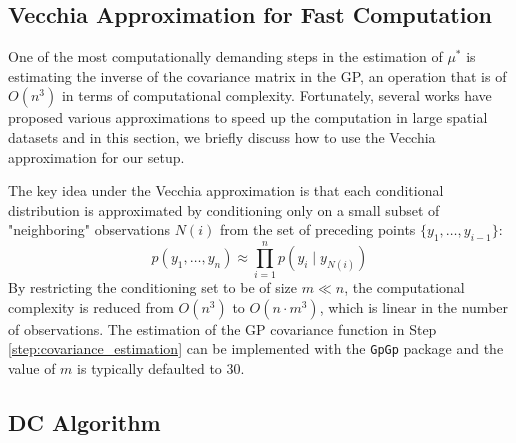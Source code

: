 \documentclass[12pt]{article}
\begin{document}
\subsection{Vecchia Approximation for Fast Computation}\label{sec:vecchia}

One of the most computationally demanding steps in the estimation of $\mu^*$ is estimating the inverse of the covariance matrix in the GP, an operation that is of $O(n^3)$ in terms of computational complexity. Fortunately, several works have proposed various approximations to speed up the computation in large spatial datasets and in this section, we briefly discuss how to use the Vecchia approximation \citep{vecchia1988estimation, datta2016hierarchical, katzfuss2021general} for our setup. %

The key idea under the Vecchia approximation is that each conditional distribution is approximated by conditioning only on a small subset of "neighboring" observations $N(i)$ from the set of preceding points $\{y_1, \dots, y_{i-1}\}$:
$$p(y_1, \dots, y_n) \approx \prod_{i=1}^n p(y_i \mid y_{N(i)})$$
By restricting the conditioning set to be of size $m \ll n$, the computational complexity is reduced from $O(n^3)$ to $O(n \cdot m^3)$, which is linear in the number of observations. The estimation of the GP covariance function in Step \ref{step:covariance_estimation} can be implemented with the \texttt{GpGp} package \citep{guinness2021gpgp} and the value of $m$ is typically defaulted to $30$. 


\subsection{DC Algorithm}\label{sec:dc_algorithm}
\end{document}
